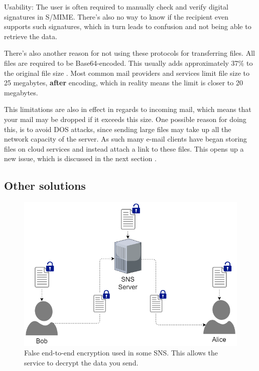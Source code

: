 Usability: The user is often required to manually check and verify digital signatures in S/MIME. There's also no way to know if the recipient even supports such signatures, which in turn leads to confusion and not being able to retrieve the data.

There's also another reason for not using these protocols for transferring files. All files are required to be Base64-encoded. This usually adds approximately 37\% to the original file size \cite{sumartonoBase64CharacterEncoding2016}. Most common mail providers and services limit file size to 25 megabytes, \textbf{after} encoding, which in reality means the limit is closer to 20 megabytes.

This limitations are also in effect in regards to incoming mail, which means that your mail may be dropped if it exceeds this size. One possible reason for doing this, is to avoid DOS attacks, since sending large files may take up all the network capacity of the server. As such many e-mail clients have began storing files on cloud services and instead attach a link to these files. This opens up a new issue, which is discussed in the next section \cite{SendAttachmentsYour}.
%
%
\subsection{Other solutions}
\label{sec:cloudetc}
\begin{figure}[th]
  \centering
  \includegraphics[width=\textwidth]{Figures/SNS}
  \decoRule
  \caption[False E2E encryption]{False end-to-end encryption used in some SNS. This allows the service to decrypt the data you send.}
  \label{fig:sns}
\end{figure}


